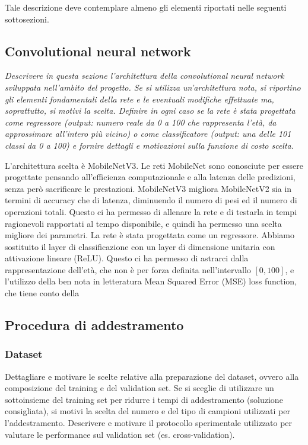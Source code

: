 Tale descrizione deve contemplare almeno gli elementi riportati nelle seguenti
sottosezioni.

\subsection{Convolutional neural network}
\emph{Descrivere in questa sezione l’architettura della convolutional neural network
sviluppata nell’ambito del progetto. Se si utilizza un’architettura nota, si riportino gli elementi fondamentali della rete e le eventuali modifiche effettuate ma, soprattutto, si motivi la scelta.
Definire in ogni caso se la rete è stata progettata come regressore (output:
numero reale da 0 a 100 che rappresenta l’età, da approssimare all’intero più
vicino) o come classificatore (output: una delle 101 classi da 0 a 100) e fornire dettagli e motivazioni sulla funzione di costo scelta.}

L'architettura scelta è MobileNetV3. Le reti MobileNet sono conosciute per essere progettate pensando all'efficienza computazionale e alla latenza delle predizioni, senza però sacrificare le prestazioni. MobileNetV3 migliora MobileNetV2 sia in termini di accuracy che di latenza, diminuendo il numero di pesi ed il numero di operazioni totali. Questo ci ha permesso di allenare la rete e di testarla in tempi ragionevoli rapportati al tempo disponibile, e quindi ha permesso una scelta migliore dei parametri.
La rete è stata progettata come un regressore. Abbiamo sostituito il layer di classificazione con un layer di dimensione unitaria con attivazione lineare (ReLU). Questo ci ha permesso di astrarci dalla rappresentazione dell'età, che non è per forza definita nell'intervallo \([0, 100]\), e l'utilizzo della ben nota in letteratura Mean Squared Error (MSE) loss function, che tiene conto della

\subsection{Procedura di addestramento}
\subsubsection{Dataset}
Dettagliare e motivare le scelte relative alla preparazione del dataset, ovvero alla composizione del training e del validation set. Se si sceglie di utilizzare un sottoinsieme del training set per ridurre i tempi di addestramento (soluzione consigliata), si motivi la scelta del numero e del tipo di campioni utilizzati per l’addestramento. Descrivere e motivare il protocollo sperimentale utilizzato per valutare le performance sul validation set (es. cross-validation).


